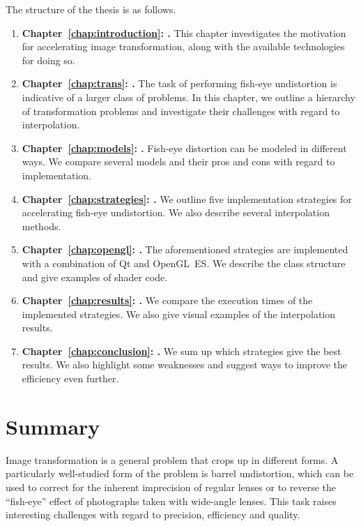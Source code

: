 \documentclass[english,12pt]{ifimaster}
\begin{document}
The structure of the thesis is as follows.
\begin{enumerate}
\item \textbf{Chapter~\ref{chap:introduction}:
    .} This chapter investigates the
  motivation for accelerating image transformation, along with the
  available technologies for doing so.
\item \textbf{Chapter~\ref{chap:trans}: .} The
  task of performing fish-eye undistortion is indicative of a larger
  class of problems. In this chapter, we outline a hierarchy of
  transformation problems and investigate their challenges with regard
  to interpolation.
\item \textbf{Chapter~\ref{chap:models}: .}
  Fish-eye distortion can be modeled in different ways. We compare
  several models and their pros and cons with regard to
  implementation.
\item \textbf{Chapter~\ref{chap:strategies}:
    .} We outline five implementation
  strategies for accelerating fish-eye undistortion. We also describe
  several interpolation methods.
\item \textbf{Chapter~\ref{chap:opengl}: .} The
  aforementioned strategies are implemented with a combination of Qt
  and OpenGL~ES. We describe the class structure and give examples of
  shader code.
\item \textbf{Chapter~\ref{chap:results}: .} We
  compare the execution times of the implemented strategies. We also
  give visual examples of the interpolation results.
\item \textbf{Chapter~\ref{chap:conclusion}:
    .} We sum up which strategies give the
  best results. We also highlight some weaknesses and suggest ways to
  improve the efficiency even further.
\end{enumerate}

\section*{Summary}


Image transformation is a general problem that crops up in different
forms. A particularly well-studied form of the problem is barrel
undistortion, which can be used to correct for the inherent
imprecision of regular lenses or to reverse the ``fish-eye'' effect of
photographs taken with wide-angle lenses. This task raises interesting
challenges with regard to precision, efficiency and quality.
\end{document}
